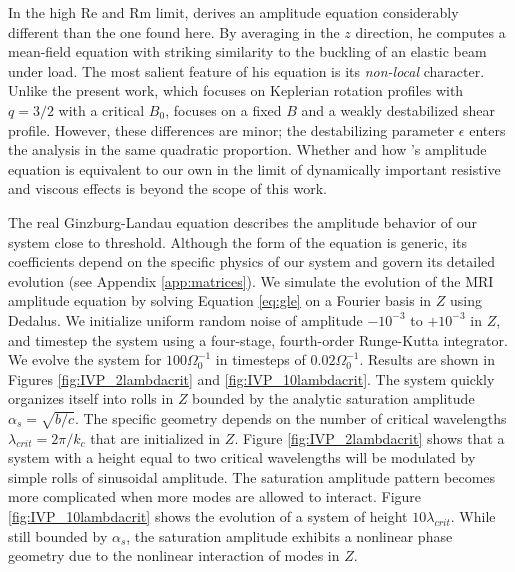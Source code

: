 \documentclass{emulateapj}
\newcommand\reye{\mathrm{Re}}
\newcommand\reym{\mathrm{Rm}}
\begin{document}
In the high $\reye$ and  $\reym$  limit, \citet{Vasil:2015} derives an amplitude equation considerably different than the one found here. By averaging in the $z$ direction, he computes a mean-field equation with striking similarity to the buckling of an elastic beam under load. The most salient feature of his equation is its \emph{non-local} character. Unlike the present work, which focuses on Keplerian rotation profiles with $q = 3/2$ with a critical $B_0$, \citet{Vasil:2015} focuses on a fixed $B$ and a weakly destabilized shear profile. However, these differences are minor; the destabilizing parameter $\epsilon$ enters the analysis in the same quadratic proportion. Whether and how \citet{Vasil:2015}'s amplitude equation is equivalent to our own in the limit of dynamically important resistive and viscous effects is beyond the scope of this work. 

The real Ginzburg-Landau equation describes the amplitude behavior of our system close to threshold. Although the form of the equation is generic, its coefficients depend on the specific physics of our system and govern its detailed evolution (see Appendix \ref{app:matrices}). We simulate the evolution of the MRI amplitude equation by solving Equation \ref{eq:gle} on a Fourier basis in $Z$ using Dedalus. We initialize uniform random noise of amplitude $-10^{-3}$ to $+10^{-3}$ in $Z$, and timestep the system using a four-stage, fourth-order Runge-Kutta integrator. We evolve the system for $100 \Omega_0^{-1}$ in timesteps of $0.02 \Omega_0^{-1}$. Results are shown in Figures \ref{fig:IVP_2lambdacrit} and \ref{fig:IVP_10lambdacrit}. The system quickly organizes itself into rolls in $Z$ bounded by the analytic saturation amplitude $\alpha_s = \sqrt{b/c}$. The specific geometry depends on the number of critical wavelengths $\lambda_{crit} = 2\pi/k_c$ that are initialized in $Z$. Figure \ref{fig:IVP_2lambdacrit} shows that a system with a height equal to two critical wavelengths will be modulated by simple rolls of sinusoidal amplitude. The saturation amplitude pattern becomes more complicated when more modes are allowed to interact. Figure \ref{fig:IVP_10lambdacrit} shows the evolution of a system of height $10 \lambda_{crit}$. While still bounded by $\alpha_s$, the saturation amplitude exhibits a nonlinear phase geometry due to the nonlinear interaction of modes in $Z$. 
\end{document}

